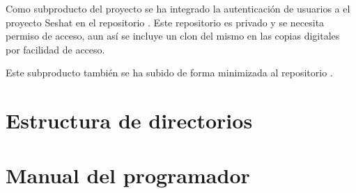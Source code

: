 
Como subproducto del proyecto se ha integrado la autenticación de usuarios a el proyecto Seshat en el repositorio . Este repositorio es privado y se necesita permiso de acceso, aun así se incluye un clon del mismo en las copias digitales por facilidad de acceso.

Este subproducto también se ha subido de forma minimizada al repositorio . 


\section{Estructura de directorios}


\section{Manual del programador}

